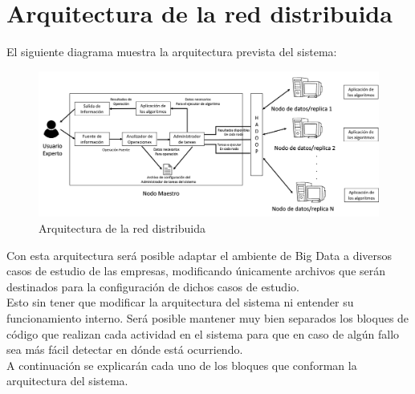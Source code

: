 \section{Arquitectura de la red distribuida}
El siguiente diagrama muestra la arquitectura prevista del sistema:
\begin{figure}[H]
	\hypertarget{fig:cap1}{\hspace{1pt}}
	\begin{center}
		\includegraphics[height=0.3\textheight]{capitulo1/images/im1.png}
		\caption{Arquitectura de la red distribuida}
		\label{fig:cap1}
	\end{center}
\end{figure}
Con esta arquitectura será posible adaptar el ambiente de Big Data a diversos casos de estudio de las empresas, modificando únicamente archivos que serán destinados para la configuración de dichos casos de estudio. 
\\
Esto sin tener que modificar la arquitectura del sistema ni entender su funcionamiento interno. Será posible
mantener muy bien separados los bloques de código que realizan cada actividad en el sistema para que en caso de algún fallo sea
más fácil detectar en dónde está ocurriendo.
\\
A continuación se explicarán cada uno de los bloques que conforman la arquitectura del sistema.
